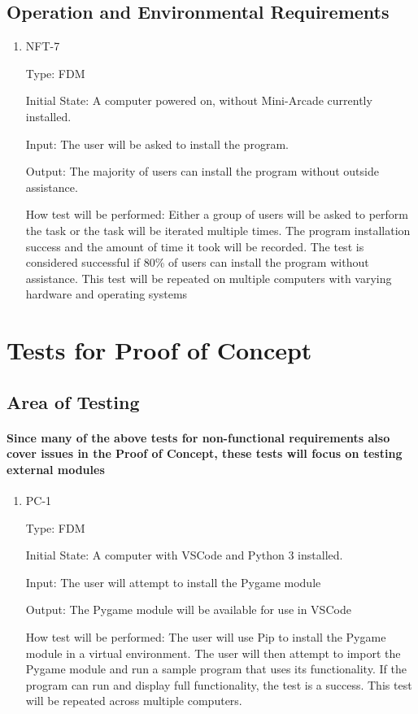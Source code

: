 \documentclass[12pt, titlepage]{article}
\begin{document}
\subsection{Operation and Environmental Requirements}
\begin{enumerate}
\item{NFT-7\\}

Type: FDM
					
Initial State: A computer powered on, without Mini-Arcade currently installed.
					
Input: The user will be asked to install the program.

Output: The majority of users can install the program without outside assistance.

How test will be performed: Either a group of users will be asked to perform the task or the task will be iterated multiple times. The program installation success and the amount of time it took will be recorded. The test is considered successful if 80\% of users can install the program without assistance. This test will be repeated on multiple computers with varying hardware and operating systems
\end{enumerate}

\section{Tests for Proof of Concept}

\subsection{Area of Testing}
		
\paragraph{Since many of the above tests for non-functional requirements also cover issues in the Proof of Concept, these tests will focus on testing external modules}

\begin{enumerate}
					
\item{PC-1\\}

Type: FDM
					
Initial State: A computer with VSCode and Python 3 installed.
					
Input: The user will attempt to install the Pygame module
					
Output: The Pygame module will be available for use in VSCode
					
How test will be performed: The user will use Pip to install the Pygame module in a virtual environment. The user will then attempt to import the Pygame module and run a sample program that uses its functionality. If the program can run and display full functionality, the test is a success. This test will be repeated across multiple computers.

\end{enumerate}
	
\end{document}

